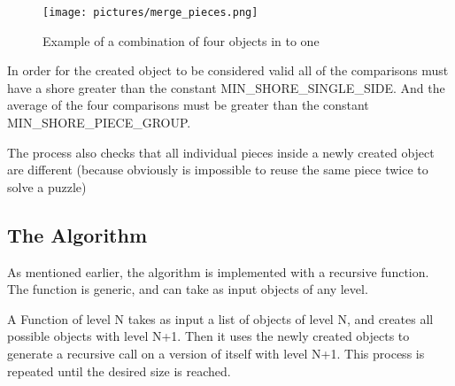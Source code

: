 \documentclass{article}
\begin{document}
\begin{figure}[H]
  \caption{Example of a combination of four objects in to one}\label{fig:merge_pieces}
  \centering
  \texttt{[image: pictures/merge\_pieces.png]}
\end{figure}

In order for the created object to be considered valid all of the comparisons must have a shore greater
than the constant MIN\_SHORE\_SINGLE\_SIDE. And the average of the four comparisons must be greater
than the constant MIN\_SHORE\_PIECE\_GROUP.

The process also checks that all individual pieces inside a newly
created object are different (because obviously is impossible to reuse the same piece twice to solve a puzzle)
\subsection{The Algorithm}

As mentioned earlier, the algorithm is implemented with a recursive function.
The function is generic, and can take as input objects of any level.

A Function of level N takes as input a list of objects of level N,
and creates all possible objects with level N+1.
Then it uses the newly created objects to generate a recursive call on a version
of itself with level N+1.
This process is repeated until the desired size is reached.
\end{document}
